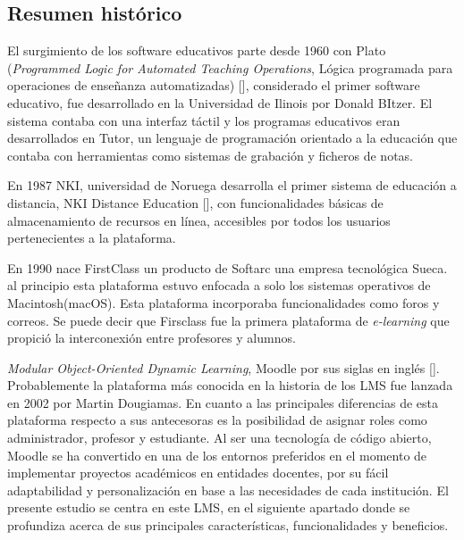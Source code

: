 \subsection{Resumen histórico}
El surgimiento de los software educativos parte desde 1960 con Plato (\textit{Programmed Logic for Automated Teaching Operations}, Lógica programada para operaciones de enseñanza automatizadas) [\cite{Wiki_Plato}], considerado el primer software educativo, fue desarrollado en la Universidad de Ilinois por Donald BItzer. El sistema contaba con una interfaz táctil y los programas educativos eran desarrollados en Tutor, un lenguaje de programación orientado a la educación que contaba con herramientas como sistemas de grabación y ficheros de notas.  

En 1987 NKI, universidad de Noruega desarrolla el primer sistema de educación a distancia, NKI Distance Education [\cite{NKI}], con funcionalidades básicas de almacenamiento de recursos en línea, accesibles por todos los usuarios pertenecientes a la plataforma.  

En 1990 nace FirstClass \cite{FirstClass} un producto de Softarc una empresa tecnológica Sueca. al principio esta plataforma estuvo enfocada a solo los sistemas operativos de Macintosh(macOS). Esta plataforma incorporaba funcionalidades como foros y correos. Se puede decir que Firsclass fue la primera plataforma de \textit{e-learning} que propició la interconexión entre profesores y alumnos.  

\textit{Modular Object-Oriented Dynamic Learning}, Moodle por sus siglas en inglés [\cite{Moodle_docs}]. Probablemente la plataforma más conocida en la historia de los LMS fue lanzada en 2002 por Martin Dougiamas. En cuanto a las principales diferencias de esta plataforma respecto a sus antecesoras es la posibilidad de asignar roles como administrador, profesor y estudiante. Al ser una tecnología de código abierto, Moodle se ha convertido en una de los entornos preferidos en el momento de implementar proyectos académicos en entidades docentes, por su fácil adaptabilidad y personalización en base a las necesidades de cada institución. El presente estudio se centra en este LMS, en el siguiente apartado donde se profundiza acerca de sus principales características, funcionalidades y beneficios.  


